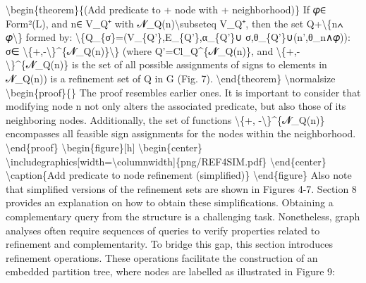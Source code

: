\documentclass{article}%
\begin{document}
\newline%
\textbackslash{}begin\{theorem\}\{(Add predicate to + node with + neighborhood)\}\newline%
If 𝜑∈ Form²(L), and n∈ V\_Q⁺ with 𝓝\_Q(n)\textbackslash{}subseteq V\_Q⁺, then the set Q+\textbackslash{}\{n∧ 𝜑\textbackslash{}\} formed by:\newline%
\textbackslash{}\{Q\_\{σ\}=(V\_\{Q'\},E\_\{Q'\},α\_\{Q'\}∪ σ,θ\_\{Q'\}∪(n',θ\_n∧𝜑)): σ∈ \textbackslash{}\{+,{-}\textbackslash{}\}\^{}\{𝓝\_Q(n)\}\textbackslash{}\}\newline%
(where Q'=Cl\_Q\^{}\{𝓝\_Q(n)\}, and \textbackslash{}\{+,{-}\textbackslash{}\}\^{}\{𝓝\_Q(n)\} is the set of all possible assignments of signs to elements in 𝓝\_Q(n))\newline%
is a refinement set of Q in G (Fig. 7).\newline%
\textbackslash{}end\{theorem\}\newline%
\textbackslash{}normalsize\newline%
\textbackslash{}begin\{proof\}\{\}\newline%
The proof resembles earlier ones. It is important to consider that modifying node n not only alters the associated predicate, but also those of its neighboring nodes. Additionally, the set of functions \textbackslash{}\{+, {-}\textbackslash{}\}\^{}\{𝓝\_Q(n)\} encompasses all feasible sign assignments for the nodes within the neighborhood.\newline%
\textbackslash{}end\{proof\}\newline%
\newline%
\textbackslash{}begin\{figure\}{[}h{]}\newline%
\textbackslash{}begin\{center\}\newline%
\textbackslash{}includegraphics{[}width=\textbackslash{}columnwidth{]}\{png/REF4SIM.pdf\}\newline%
\textbackslash{}end\{center\}\newline%
\textbackslash{}caption\{Add predicate to node refinement (simplified)\}\newline%
\textbackslash{}end\{figure\}\newline%
\newline%
Also note that simplified versions of the refinement sets are shown in Figures 4{-}7. Section 8 provides an explanation on how to obtain these simplifications.\newline%
\newline%
Obtaining a complementary query from the structure is a challenging task. Nonetheless, graph analyses often require sequences of queries to verify properties related to refinement and complementarity. To bridge this gap, this section introduces refinement operations. These operations facilitate the construction of an embedded partition tree, where nodes are labelled as illustrated in Figure 9:\newline%
\end{document}
